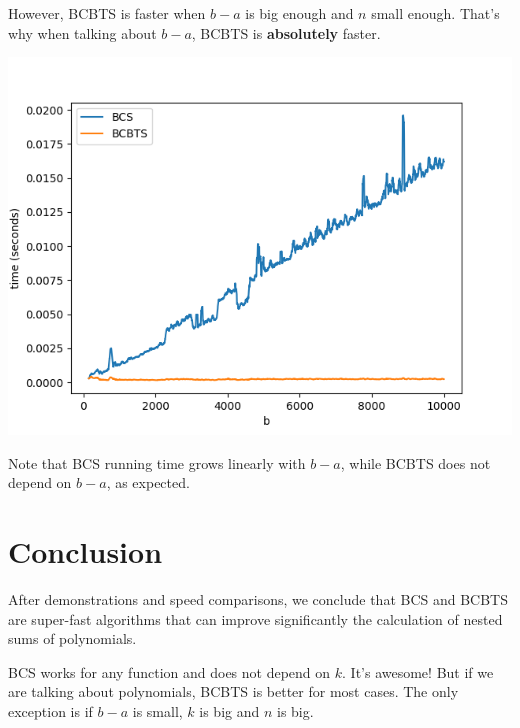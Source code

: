 \documentclass[12pt]{article}
\begin{document}
However, BCBTS is faster when $b-a$ is big enough and $n$ small enough. That's why when talking about $b-a$, BCBTS is \textbf{absolutely} faster.

\begin{center}
    \includegraphics[scale=.7]{assets/4.png}
\end{center}

Note that BCS running time grows linearly with $b-a$, while BCBTS does not depend on $b-a$, as expected.

\section{Conclusion}

After demonstrations and speed comparisons, we conclude that BCS and BCBTS are super-fast algorithms that can improve significantly the calculation of nested sums of polynomials.

\vspace{10px}

BCS works for any function and does not depend on $k$. It's awesome! But if we are talking about polynomials, BCBTS is better for most cases. The only exception is if $b-a$ is small, $k$ is big and $n$ is big.
\end{document}
